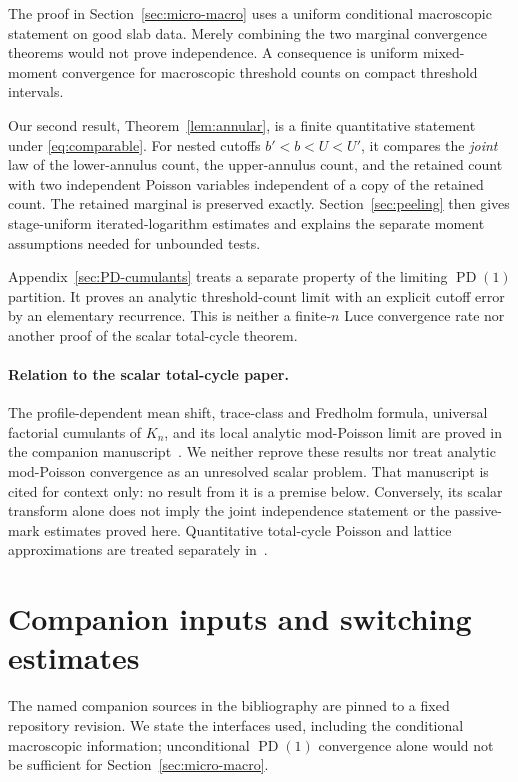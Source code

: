 \documentclass[11pt]{article}
\numberwithin{equation}{section}
\newcommand{\PD}{\operatorname{PD}}
\theoremstyle{definition}
\theoremstyle{remark}
\begin{document}
The proof in Section~\ref{sec:micro-macro} uses a uniform conditional
macroscopic statement on good slab data.  Merely combining the two
marginal convergence theorems would not prove independence.  A consequence
is uniform mixed-moment convergence for macroscopic threshold counts on
compact threshold intervals.

Our second result, Theorem~\ref{lem:annular}, is a finite quantitative
statement under \eqref{eq:comparable}.  For nested cutoffs
$b'<b<U<U'$, it compares the \emph{joint} law of the lower-annulus count,
the upper-annulus count, and the retained count with two independent
Poisson variables independent of a copy of the retained count.  The
retained marginal is preserved exactly.  Section~\ref{sec:peeling}
then gives stage-uniform iterated-logarithm estimates and explains the
separate moment assumptions needed for unbounded tests.

Appendix~\ref{sec:PD-cumulants} treats a separate property of the limiting
$\PD(1)$ partition.  It proves an analytic threshold-count limit with an
explicit cutoff error by an elementary recurrence.  This is neither a
finite-$n$ Luce convergence rate nor another proof of the scalar
total-cycle theorem.

\paragraph{Relation to the scalar total-cycle paper.}
The profile-dependent mean shift, trace-class and Fredholm formula,
universal factorial cumulants of $K_n$, and its local analytic mod-Poisson
limit are proved in the companion manuscript~\cite{LongModPoisson2026}.
We neither reprove these results nor treat analytic mod-Poisson convergence
as an unresolved scalar problem.  That manuscript is cited for context
only: no result from it is a premise below.  Conversely, its scalar
transform alone does not imply the joint independence statement or the
passive-mark estimates proved here.  Quantitative total-cycle Poisson and
lattice approximations are treated separately in~\cite{LongTotalCycles2026}.

\section{Companion inputs and switching estimates}\label{sec:inputs}

The named companion sources in the bibliography are pinned to a fixed
repository revision.  We state the interfaces used, including the
conditional macroscopic information; unconditional $\PD(1)$ convergence
alone would not be sufficient for Section~\ref{sec:micro-macro}.
\end{document}
